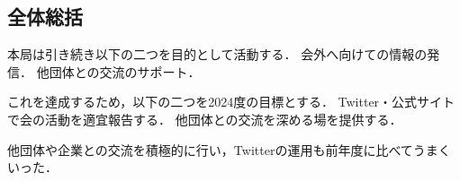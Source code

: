 \subsection*{全体総括}


本局は引き続き以下の二つを目的として活動する．
    会外へ向けての情報の発信．
    他団体との交流のサポート．
 
これを達成するため，以下の二つを2024度の目標とする．
    Twitter・公式サイトで会の活動を適宜報告する．
    他団体との交流を深める場を提供する．

他団体や企業との交流を積極的に行い，Twitterの運用も前年度に比べてうまくいった．